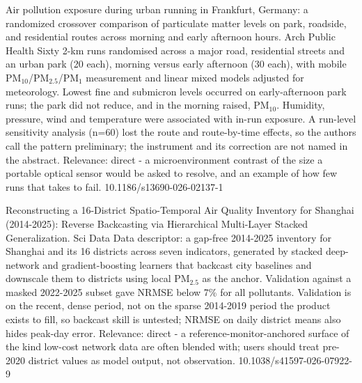 \documentclass[10pt]{article}
\begin{document}
{Air pollution exposure during urban running in Frankfurt, Germany: a randomized crossover comparison of particulate matter levels on park, roadside, and residential routes across morning and early afternoon hours.}
{Arch Public Health}
{Sixty 2-km runs randomised across a major road, residential streets and an urban park (20 each), morning versus early afternoon (30 each), with mobile PM$_{10}$/PM$_{2.5}$/PM$_{1}$ measurement and linear mixed models adjusted for meteorology. Lowest fine and submicron levels occurred on early-afternoon park runs; the park did not reduce, and in the morning raised, PM$_{10}$. Humidity, pressure, wind and temperature were associated with in-run exposure. A run-level sensitivity analysis (n=60) lost the route and route-by-time effects, so the authors call the pattern preliminary; the instrument and its correction are not named in the abstract. Relevance: direct - a microenvironment contrast of the size a portable optical sensor would be asked to resolve, and an example of how few runs that takes to fail.}
{10.1186/s13690-026-02137-1}

{Reconstructing a 16-District Spatio-Temporal Air Quality Inventory for Shanghai (2014-2025): Reverse Backcasting via Hierarchical Multi-Layer Stacked Generalization.}
{Sci Data}
{Data descriptor: a gap-free 2014-2025 inventory for Shanghai and its 16 districts across seven indicators, generated by stacked deep-network and gradient-boosting learners that backcast city baselines and downscale them to districts using local PM$_{2.5}$ as the anchor. Validation against a masked 2022-2025 subset gave NRMSE below 7\% for all pollutants. Validation is on the recent, dense period, not on the sparse 2014-2019 period the product exists to fill, so backcast skill is untested; NRMSE on daily district means also hides peak-day error. Relevance: direct - a reference-monitor-anchored surface of the kind low-cost network data are often blended with; users should treat pre-2020 district values as model output, not observation.}
{10.1038/s41597-026-07922-9}
\end{document}
